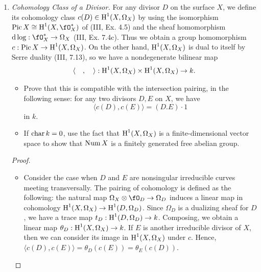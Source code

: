 \documentclass[a4paper]{article}
\begin{document}
\begin{enumerate} [label=\textbf{\arabic*.}, leftmargin=0em]
    \item \textit{Cohomology Class of a Divisor.} For any divisor $D$ on the surface $X$, we define its cohomology class $c(D) \in \operatorname{H}^1(X, \Omega_X)$ by using the isomorphism $\pic{X} \cong \cH^1(X, \fO_X^*)$ of (III, Ex. 4.5) and the sheaf homomorphism $\dlog : \fO_X^* \to \Omega_X$ (III, Ex. 7.4c).
          Thus we obtain a group homomorphism $c : \operatorname{Pic}{X} \to \operatorname{H}^1(X, \Omega_X)$.
          On the other hand, $\operatorname{H}^1(X, \Omega_X)$ is dual to itself by Serre duality (III, 7.13), so we have a nondegenerate bilinear map
          \begin{equation*}
              \langle \quad, \quad \rangle : \operatorname{H}^1(X, \Omega_X) \times \operatorname{H}^1(X, \Omega_X) \to k.
          \end{equation*}
          \begin{itemize}
              \item[(a)] Prove that this is compatible with the intersection pairing, in the following sense: for any two divisors $D, E$ on $X$, we have
                    \begin{equation*}
                        \langle c(D), c(E) \rangle = (D.E) \cdot 1
                    \end{equation*}
                    in $k$.
              \item[(b)] If $\operatorname{char}{k} = 0$, use the fact that $\operatorname{H}^1(X, \Omega_X)$ is a finite-dimensional vector space to show that $\operatorname{Num}{X}$ is a finitely generated free abelian group.
          \end{itemize}

          \begin{proof} $ $ \vspace{0pt}
              \begin{itemize} [leftmargin=0cm]
                  \item[(a)] Consider the case when $D$ and $E$ are nonsingular irreducible curves meeting transversally.
                        The pairing of cohomology is defined as the following: the natural map $\Omega_X \otimes \fO_D \to \Omega_D$ induces a linear map in cohomology $\operatorname{H}^1(X, \Omega_X) \to \operatorname{H}^1(D, \Omega_D)$.
                        Since $\Omega_D$ is a dualizing sheaf for $D$, we have a trace map $t_D : \operatorname{H}^1(D, \Omega_D) \to k$.
                        Composing, we obtain a linear map $\theta_D : \operatorname{H}^1(X, \Omega_X) \to k$.
                        If $E$ is another irreducible divisor of $X$, then we can consider its image in $\operatorname{H}^1(X, \Omega_X)$ under $c$.
                        Hence, $\langle c(D), c(E) \rangle = \theta_D(c(E)) = \theta_E(c(D))$.


\end{itemize}
\end{proof}
\end{enumerate}
\end{document}
